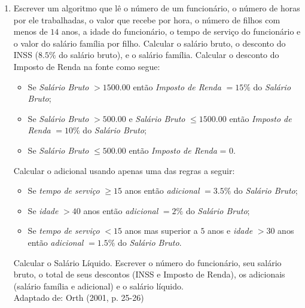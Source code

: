 \documentclass[onecolumn,a4paper,10pt]{report}
\newcommand{\+}{\, + \,}
\newcommand{\<}{\hspace*{-0.4cm}}
\begin{document}
\begin{enumerate}[1.]
\item Escrever um algoritmo que lê o número de um funcionário, o número de horas por ele trabalhadas, o valor que recebe por hora, o número de filhos com menos de $14$ anos, a idade do funcionário, o tempo de serviço do funcionário e o valor do salário família por filho. Calcular o salário bruto, o desconto do INSS ($8.5\%$ do salário bruto), e o salário família. Calcular o desconto do Imposto de Renda na fonte como segue:
\begin{itemize}
    \item Se \emph{Salário Bruto} $> 1500.00$ então \emph{Imposto de Renda} $= 15\%$ do \emph{Salário Bruto};
    \item Se \emph{Salário Bruto} $> 500.00$ e \emph{Salário Bruto} $\leq 1500.00$ então \emph{Imposto de Renda} $= 10\%$ do \emph{Salário Bruto};
    \item Se \emph{Salário Bruto} $\leq 500.00$ então \emph{Imposto de Renda} = $0$.
\end{itemize}
Calcular o adicional usando apenas uma das regras a seguir:
\begin{itemize}
    \item Se \emph{tempo de serviço} $\geq 15$ anos então \emph{adicional} $= 3.5\%$ do \emph{Salário Bruto};
    \item Se \emph{idade} $> 40$ anos então \emph{adicional} $= 2\%$ do \emph{Salário Bruto};
    \item Se \emph{tempo de serviço} $< 15$ anos mas superior a $5$ anos e \emph{idade} $> 30$ anos então \emph{adicional} $= 1.5\%$ do \emph{Salário Bruto}.
\end{itemize}
Calcular o Salário Líquido. Escrever o número do funcionário, seu salário bruto, o total de seus descontos (INSS e Imposto de Renda), os adicionais (salário família e adicional) e o salário líquido.\\
{\tiny Adaptado de: Orth (2001, p. 25-26)}


\end{enumerate}
\end{document}
